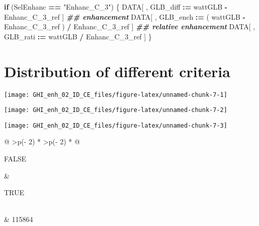 \documentclass[
  10pt,
  a4paper,oneside]{article}
\newenvironment{Shaded}{\begin{snugshade}}{\end{snugshade}}
\newcommand{\ControlFlowTok}[1]{\textcolor[rgb]{0.13,0.29,0.53}{\textbf{#1}}}
\newcommand{\DocumentationTok}[1]{\textcolor[rgb]{0.56,0.35,0.01}{\textbf{\textit{#1}}}}
\newcommand{\NormalTok}[1]{#1}
\newcommand{\SpecialCharTok}[1]{\textcolor[rgb]{0.81,0.36,0.00}{\textbf{#1}}}
\newcommand{\StringTok}[1]{\textcolor[rgb]{0.31,0.60,0.02}{#1}}
\begin{document}
\begin{Shaded}
\begin{Highlighting}[]
\ControlFlowTok{if}\NormalTok{ (SelEnhanc }\SpecialCharTok{==} \StringTok{"Enhanc\_C\_3"}\NormalTok{) \{}
\NormalTok{    DATA[ , GLB\_diff }\SpecialCharTok{:=}\NormalTok{   wattGLB }\SpecialCharTok{{-}}\NormalTok{ Enhanc\_C\_3\_ref                    ] }\DocumentationTok{\#\# enhancement}
\NormalTok{    DATA[ , GLB\_ench }\SpecialCharTok{:=}\NormalTok{ ( wattGLB }\SpecialCharTok{{-}}\NormalTok{ Enhanc\_C\_3\_ref ) }\SpecialCharTok{/}\NormalTok{ Enhanc\_C\_3\_ref ] }\DocumentationTok{\#\# relative enhancement}
\NormalTok{    DATA[ , GLB\_rati }\SpecialCharTok{:=}\NormalTok{   wattGLB }\SpecialCharTok{/}\NormalTok{ Enhanc\_C\_3\_ref                    ]}
\NormalTok{\}}
\end{Highlighting}
\end{Shaded}

\FloatBarrier

\hypertarget{distribution-of-different-criteria}{%
\section{Distribution of different criteria}\label{distribution-of-different-criteria}}

\begin{center}\texttt{[image: GHI\_enh\_02\_ID\_CE\_files/figure-latex/unnamed-chunk-7-1]} \end{center}

\begin{center}\texttt{[image: GHI\_enh\_02\_ID\_CE\_files/figure-latex/unnamed-chunk-7-2]} \end{center}

\begin{center}\texttt{[image: GHI\_enh\_02\_ID\_CE\_files/figure-latex/unnamed-chunk-7-3]} \end{center}

\begin{longtable}[]{@{}
  >{\raggedleft\arraybackslash}p{(\columnwidth - 2\tabcolsep) * }
  >{\raggedleft\arraybackslash}p{(\columnwidth - 2\tabcolsep) * }@{}}
\toprule\noalign{}
\begin{minipage}[b]{\linewidth}\raggedleft
FALSE
\end{minipage} & \begin{minipage}[b]{\linewidth}\raggedleft
TRUE
\end{minipage} \\
\midrule\noalign{}
\endhead
\bottomrule\noalign{}
 & 115864 \\
\end{longtable}
\end{document}
